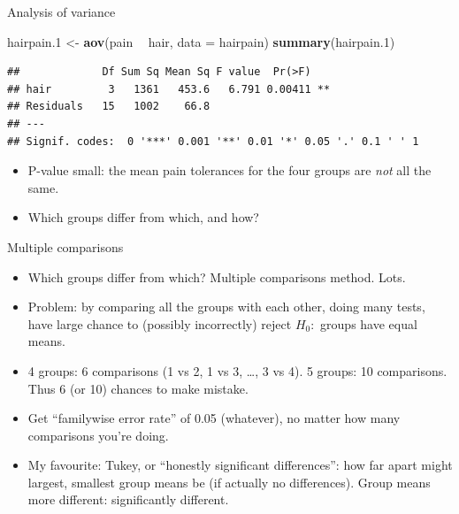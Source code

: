 \documentclass[
  ignorenonframetext,
]{beamer}
\newenvironment{Shaded}{\begin{snugshade}}{\end{snugshade}}
\newcommand{\DataTypeTok}[1]{\textcolor[rgb]{0.13,0.29,0.53}{#1}}
\newcommand{\FloatTok}[1]{\textcolor[rgb]{0.00,0.00,0.81}{#1}}
\newcommand{\KeywordTok}[1]{\textcolor[rgb]{0.13,0.29,0.53}{\textbf{#1}}}
\newcommand{\NormalTok}[1]{#1}
\newcommand{\OperatorTok}[1]{\textcolor[rgb]{0.81,0.36,0.00}{\textbf{#1}}}
\newcommand{\StringTok}[1]{\textcolor[rgb]{0.31,0.60,0.02}{#1}}
\begin{document}
\begin{frame}[fragile]{Analysis of variance}
\protect\hypertarget{analysis-of-variance-2}{}

\small

\begin{Shaded}
\begin{Highlighting}[]
\NormalTok{hairpain}\FloatTok{.1}\NormalTok{ <-}\StringTok{ }\KeywordTok{aov}\NormalTok{(pain }\OperatorTok{~}\StringTok{ }\NormalTok{hair, }\DataTypeTok{data =}\NormalTok{ hairpain)}
\KeywordTok{summary}\NormalTok{(hairpain}\FloatTok{.1}\NormalTok{)}
\end{Highlighting}
\end{Shaded}

\begin{verbatim}
##             Df Sum Sq Mean Sq F value  Pr(>F)   
## hair         3   1361   453.6   6.791 0.00411 **
## Residuals   15   1002    66.8                   
## ---
## Signif. codes:  0 '***' 0.001 '**' 0.01 '*' 0.05 '.' 0.1 ' ' 1
\end{verbatim}

\normalsize

\begin{itemize}
\item
  P-value small: the mean pain tolerances for the four groups are
  \emph{not} all the same.
\item
  Which groups differ from which, and how?
\end{itemize}

\end{frame}

\begin{frame}{Multiple comparisons}
\protect\hypertarget{multiple-comparisons}{}

\begin{itemize}
\item
  Which groups differ from which? Multiple comparisons method. Lots.
\item
  Problem: by comparing all the groups with each other, doing many
  tests, have large chance to (possibly incorrectly) reject \(H_0:\)
  groups have equal means.
\item
  4 groups: 6 comparisons (1 vs 2, 1 vs 3, \ldots, 3 vs 4). 5 groups: 10
  comparisons. Thus 6 (or 10) chances to make mistake.
\item
  Get ``familywise error rate'' of 0.05 (whatever), no matter how many
  comparisons you're doing.
\item
  My favourite: Tukey, or ``honestly significant differences'': how far
  apart might largest, smallest group means be (if actually no
  differences). Group means more different: significantly different.
\end{itemize}

\end{frame}
\end{document}
